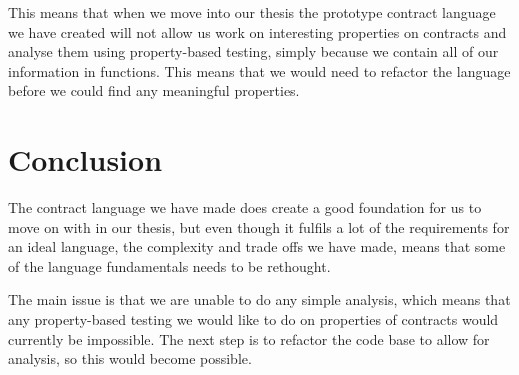 \documentclass{ituthesis}
\begin{document}
This means that when we move into our thesis the prototype contract language we have created will not allow us work on interesting properties on contracts and analyse them using property-based testing, simply because we contain all of our information in functions. This means that we would need to refactor the language before we could find any meaningful properties.

\chapter{Conclusion}
The contract language we have made does create a good foundation for us to move on with in our thesis, but even though it fulfils a lot of the requirements for an ideal language, the complexity and trade offs we have made, means that some of the language fundamentals needs to be rethought.

The main issue is that we are unable to do any simple analysis, which means that any property-based testing we would like to do on properties of contracts would currently be impossible. The next step is to refactor the code base to allow for analysis, so this would become possible.



\printbibliography
\end{document}
